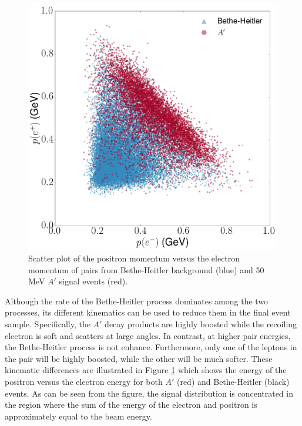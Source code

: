 \begin{figure}[ht]
    \centering
    \includegraphics[width=.8\textwidth]{images/bh_energy_cut.png}
    \caption{Scatter plot of the positron momentum versus the electron momentum 
             of pairs from Bethe-Heitler background (blue) and 50 MeV $A'$
             signal events (red).}
    \label{fig:ap_v_bethe}
\end{figure}
Although the rate of the Bethe-Heitler process dominates among the two 
processes, its different kinematics can be used to reduce them in the final 
event sample.  Specifically, the $A'$ decay products are highly boosted while 
the recoiling electron is soft and scatters at large angles.  In contrast, 
at higher pair energies, the Bethe-Heitler process is not enhance.  Furthermore,
only one of the leptons in the pair will be highly boosted, while the other
will be much softer.  
These kinematic differences are illustrated in Figure \ref{fig:ap_v_bethe} which
shows the energy of the positron versus the electron energy for both $A'$ (red)
and Bethe-Heitler (black) events.  As can be seen from the figure, the signal
distribution is concentrated in the region where the sum of the energy of the
electron and positron is approximately equal to the beam energy.


